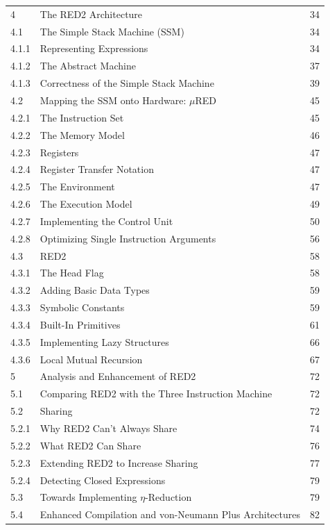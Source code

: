 \clearpage
\thispagestyle{plain}
\begin{tabular}{@{}p{0.75in}p{4.35in}r@{}}
4 & The RED2 Architecture & 34\\
4.1 & The Simple Stack Machine (SSM) & 34\\
4.1.1 & Representing Expressions & 34\\
4.1.2 & The Abstract Machine & 37\\
4.1.3 & Correctness of the Simple Stack Machine & 39\\
4.2 & Mapping the SSM onto Hardware: \(\mu\)RED & 45\\
4.2.1 & The Instruction Set & 45\\
4.2.2 & The Memory Model & 46\\
4.2.3 & Registers & 47\\
4.2.4 & Register Transfer Notation & 47\\
4.2.5 & The Environment & 47\\
4.2.6 & The Execution Model & 49\\
4.2.7 & Implementing the Control Unit & 50\\
4.2.8 & Optimizing Single Instruction Arguments & 56\\
4.3 & RED2 & 58\\
4.3.1 & The Head Flag & 58\\
4.3.2 & Adding Basic Data Types & 59\\
4.3.3 & Symbolic Constants & 59\\
4.3.4 & Built-In Primitives & 61\\
4.3.5 & Implementing Lazy Structures & 66\\
4.3.6 & Local Mutual Recursion & 67\\[0.3em]
5 & Analysis and Enhancement of RED2 & 72\\
5.1 & Comparing RED2 with the Three Instruction Machine & 72\\
5.2 & Sharing & 72\\
5.2.1 & Why RED2 Can't Always Share & 74\\
5.2.2 & What RED2 Can Share & 76\\
5.2.3 & Extending RED2 to Increase Sharing & 77\\
5.2.4 & Detecting Closed Expressions & 79\\
5.3 & Towards Implementing \(\eta\)-Reduction & 79\\
5.4 & Enhanced Compilation and von-Neumann Plus Architectures & 82\\
\end{tabular}

